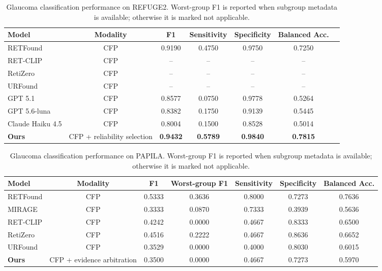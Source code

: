\begin{table}[h]
\centering
\caption{Glaucoma classification performance on REFUGE2. Worst-group F1 is reported when subgroup metadata is available; otherwise it is marked not applicable.}
\label{tab:glaucoma_refuge2}
\begin{tabular}{lcccccc}
\toprule
\textbf{Model} & \textbf{Modality} & \textbf{F1} & \textbf{Sensitivity} & \textbf{Specificity} & \textbf{Balanced Acc.} \\
\midrule
RETFound & CFP & 0.9190 & 0.4750 & 0.9750 & 0.7250 \\
RET-CLIP & CFP & -- & -- & -- & -- \\
RetiZero & CFP & -- & -- & -- & -- \\
URFound & CFP & -- & -- & -- & -- \\
GPT 5.1 & CFP & 0.8577 & 0.0750 & 0.9778 & 0.5264 \\
GPT 5.6-luna & CFP & 0.8382 & 0.1750 & 0.9139 & 0.5445 \\
Claude Haiku 4.5 & CFP & 0.8004 & 0.1500 & 0.8528 & 0.5014 \\
\textbf{Ours} & CFP + reliability selection & \textbf{0.9432} & \textbf{0.5789} & \textbf{0.9840} & \textbf{0.7815} \\
\bottomrule
\end{tabular}
\end{table}

\begin{table}[t]
\centering
\caption{Glaucoma classification performance on PAPILA. Worst-group F1 is reported when subgroup metadata is available; otherwise it is marked not applicable.}
\label{tab:glaucoma_papila}
\begin{tabular}{lcccccc}
\toprule
\textbf{Model} & \textbf{Modality} & \textbf{F1} & \textbf{Worst-group F1} & \textbf{Sensitivity} & \textbf{Specificity} & \textbf{Balanced Acc.} \\
\midrule
RETFound & CFP & 0.5333 & 0.3636 & 0.8000 & 0.7273 & 0.7636 \\
MIRAGE & CFP & 0.3333 & 0.0870 & 0.7333 & 0.3939 & 0.5636 \\
RET-CLIP & CFP & 0.4242 & 0.0000 & 0.4667 & 0.8333 & 0.6500 \\
RetiZero & CFP & 0.4516 & 0.2222 & 0.4667 & 0.8636 & 0.6652 \\
URFound & CFP & 0.3529 & 0.0000 & 0.4000 & 0.8030 & 0.6015 \\
\textbf{Ours} & CFP + evidence arbitration & 0.3500 & 0.0000 & 0.4667 & 0.7273 & 0.5970 \\
\bottomrule
\end{tabular}
\end{table}

